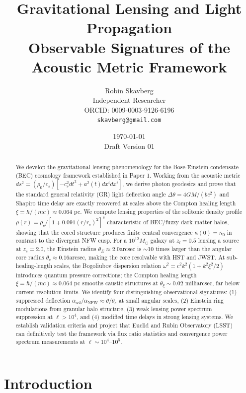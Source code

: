 \documentclass[11pt,a4paper]{article}
\title{\textbf{Gravitational Lensing and Light Propagation}\\[0.5em]
\large Observable Signatures of the Acoustic Metric Framework}
\author{Robin Skavberg\\[0.3em]
\small Independent Researcher\\
\small ORCID: 0009-0003-9126-6196\\
\small \texttt{skavberg@gmail.com}}
\date{\today\\[0.5em]
\small Draft Version 01}
\newcommand{\Msun}{\ensuremath{M_\odot}}
\newcommand{\arcsec}{\ensuremath{\text{arcsec}}}
\theoremstyle{definition}
\theoremstyle{remark}
\begin{document}
\maketitle

\begin{abstract}
We develop the gravitational lensing phenomenology for the Bose-Einstein condensate (BEC) cosmology framework established in Paper 1. Working from the acoustic metric $ds^2 = (\rho_0/c_s)[-c_s^2 dt^2 + a^2(t) dx^i dx^i]$, we derive photon geodesics and prove that the standard general relativity (GR) light deflection angle $\Delta\theta = 4GM/(bc^2)$ and Shapiro time delay are exactly recovered at scales above the Compton healing length $\xi = \hbar/(mc) \approx 0.064$ pc. We compute lensing properties of the solitonic density profile $\rho(r) = \rho_c/[1 + 0.091(r/r_c)^2]^8$ characteristic of BEC/fuzzy dark matter halos, showing that the cored structure produces finite central convergence $\kappa(0) = \kappa_0$ in contrast to the divergent NFW cusp. For a $10^{12} \Msun$ galaxy at $z_l = 0.5$ lensing a source at $z_s = 2.0$, the Einstein radius $\theta_E \approx 2.0\arcsec$ is $\sim$10 times larger than the angular core radius $\theta_c \approx 0.16\arcsec$, making the core resolvable with HST and JWST. At sub-healing-length scales, the Bogoliubov dispersion relation $\omega^2 = c^2 k^2(1 + k^2\xi^2/2)$ introduces quantum pressure corrections; the Compton healing length $\xi = \hbar/(mc) \approx 0.064$ pc smooths caustic structures at $\theta_\xi \sim 0.02$ milliarcsec, far below current resolution limits. We identify four distinguishing observational signatures: (1) suppressed deflection $\alpha_{\mathrm{sol}}/\alpha_{\mathrm{NFW}} \approx \theta/\theta_c$ at small angular scales, (2) Einstein ring modulations from granular halo structure, (3) weak lensing power spectrum suppression at $\ell > 10^4$, and (4) modified time delays in strong lensing systems. We establish validation criteria and project that Euclid and Rubin Observatory (LSST) can definitively test the framework via flux ratio statistics and convergence power spectrum measurements at $\ell \sim 10^4$--$10^5$.
\end{abstract}

\tableofcontents
\newpage

\section{Introduction}
\label{sec:introduction}
\end{document}
